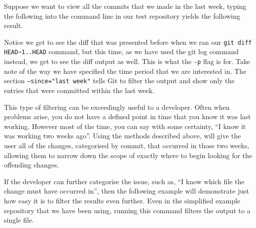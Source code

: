 Suppose we want to view all the commits that we made in the last week, typing the following into the command line in our test repository yields the following result.


Notice we get to see the diff that was presented before when we ran our \texttt{git diff HEAD\textasciitilde1..HEAD} command, but this time, as we have used the git log command instead, we get to see the diff output as well.  This is what the \texttt{-p} flag is for.  Take note of the way we have specified the time period that we are interested in.  The section \texttt{--since="last week"} tells Git to filter the output and show only the entries that were committed within the last week.

This type of filtering can be exceedingly useful to a developer.  Often when problems arise, you do not have a defined point in time that you know it was last working.  However most of the time, you can say with some certainty, ``I know it was working two weeks ago''.  Using the methods described above, will give the user all of the changes, categorised by commit, that occurred in those two weeks, allowing them to narrow down the scope of exactly where to begin looking for the offending changes.

If the developer can further categorise the issue, such as, ``I know which file the change must have occurred in'', then the following example will demonstrate just how easy it is to filter the results even further.  Even in the simplified example repository that we have been using, running this command filters the output to a single file.

